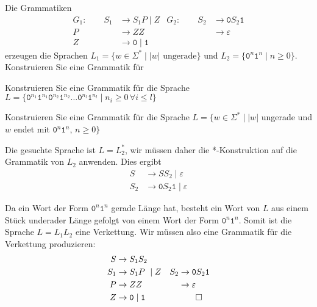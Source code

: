Die Grammatiken
\begin{align*}
G_1:\qquad
S_1 & \to S_1P \mid Z               & G_2:\qquad S_2 & \to \texttt{0}S_2\texttt{1}    \\
P   & \to ZZ                        &     & \to \varepsilon                \\
Z   & \to \texttt{0}\mid\texttt{1}  &     &                               
\end{align*}
erzeugen die Sprachen $L_1=\{w\in\Sigma^*\mid  \text{$|w|$ ungerade}\}$
und $L_2=\{\texttt{0}^n\texttt{1}^n \mid n\ge 0\}$.
Konstruieren Sie eine Grammatik für
\begin{teilaufgaben}
\item Konstruieren Sie eine Grammatik für die Sprache $L=\{
\texttt{0}^{n_1}\texttt{1}^{n_1}
\texttt{0}^{n_2}\texttt{1}^{n_2}
\dots
\texttt{0}^{n_l}\texttt{1}^{n_l}
\mid
n_i\ge 0\,\forall i\le l
\}$
\item Konstruieren Sie eine Grammatik für die Sprache $L=\{
w\in\Sigma^* \mid |w|$
 ungerade und $w$ endet mit $\texttt{0}^n\texttt{1}^n$, $n\ge 0 \}$
\end{teilaufgaben}

\begin{loesung}
\begin{teilaufgaben}
\item
Die gesuchte Sprache ist $L=L_2^*$, wir müssen daher die *-Konstruktion
auf die Grammatik von $L_2$ anwenden.
Dies ergibt 
\begin{align*}
S   & \to SS_2 \mid \varepsilon  \\
S_2 & \to \texttt{0}S_2\texttt{1} \mid \varepsilon
\end{align*}
\item
Da ein Wort der Form $\texttt{0}^n\texttt{1}^n$ gerade Länge hat, besteht
ein Wort von $L$ aus einem Stück underader Länge gefolgt von einem
Wort der Form $\texttt{0}^n\texttt{1}^n$.
Somit ist die Sprache $L=L_1L_2$ eine Verkettung.
Wir müssen also eine Grammatik für die Verkettung produzieren:
\begin{align*}
S   & \to S_1S_2                    &     &                                \\
S_1 & \to S_1P \mid Z               & S_2 & \to \texttt{0}S_2\texttt{1}    \\
P   & \to ZZ                        &     & \to \varepsilon                \\
Z   & \to \texttt{0}\mid\texttt{1}  &     &                               
\qedhere
\end{align*}
\end{teilaufgaben}
\end{loesung}




